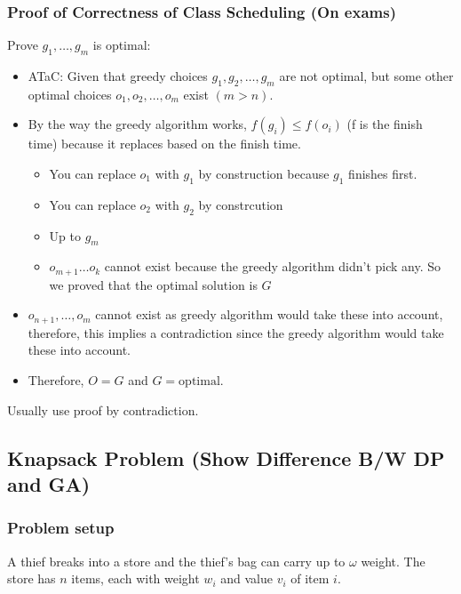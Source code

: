 \subsubsection{Proof of Correctness of Class Scheduling (On exams)}
\begin{derivation}

    Prove $g_1,\ldots,g_m$ is optimal:
    \begin{itemize}
        \item ATaC: Given that greedy choices $g_1, g_2, \dots, g_m$ are not optimal, but some other optimal choices $o_1, o_2, \dots, o_m$ exist $(m > n)$. 
        \item By the way the greedy algorithm works, $f(g_i) \leq f(o_i)$ (f is the finish time) because it replaces based on the finish time. 
        \begin{itemize}
            \item You can replace $o_1$ with $g_1$ by construction because $g_1$ finishes first. 
            \item You can replace $o_2$ with $g_2$ by constrcution 
            \item Up to $g_m$
            \item $o_{m+1} \ldots o_k$ cannot exist because the greedy algorithm didn't pick any. So we proved that the optimal solution is $G$
        \end{itemize}
        \item $o_{n+1},\dots, o_m$ cannot exist as greedy algorithm would take these into account, therefore, this implies a contradiction since the greedy algorithm would take these into account.
        \item Therefore, $O=G$ and $G=\text{optimal}$.
    \end{itemize}
\end{derivation}

\begin{warning}
    Usually use proof by contradiction. 
\end{warning}

\subsection{Knapsack Problem (Show Difference B/W DP and GA)}

\subsubsection{Problem setup}
\begin{intuition}
A thief breaks into a store and the thief's bag can carry up to $\omega$ weight. The store has $n$ items, each with weight $w_i$ and value $v_i$ of item $i$.
\end{intuition}

